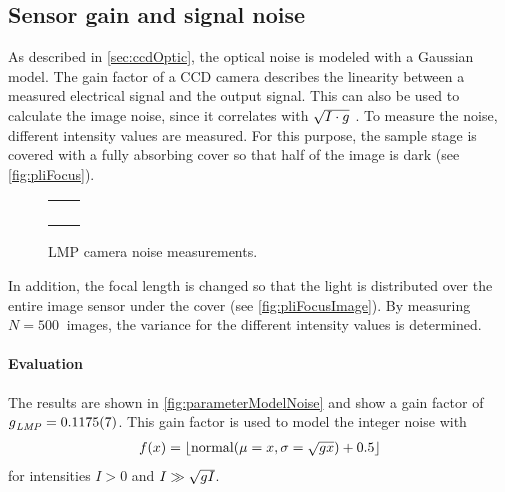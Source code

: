 \subsection{Sensor gain and signal noise}\label{sec:sensorGain}
%
As described in \cref{sec:ccdOptic}, the optical noise is modeled with a Gaussian model.
The gain factor of a \ac{CCD} camera describes the linearity between a measured electrical signal and the output signal.
This can also be used to calculate the image noise, since it correlates with $\sqrt{I \cdot \opticgain}$ \cite{Wiese:887678}.
To measure the noise, different intensity values are measured.
For this purpose, the sample stage is covered with a fully absorbing cover so that half of the image is dark (see \cref{fig:pliFocus}).
%
\begin{figure}[!t]
\centering
%
\setlength{\tikzwidth}{0.3\textwidth}
\setlength{\tikzheight}{0.3\textwidth}
%
\setlength{\tabcolsep}{0em}
\begin{tabular}{C{0.5\textwidth}C{0.5\textwidth}}
&
\\[-1em]
%
 &
 \\[2em]
%
&
\\[-1em]
%
 &
\end{tabular}
%
\caption[]{\ac{LMP} camera noise measurements.}
\label{fig:parameterModelGain}
\end{figure}
%
In addition, the focal length is changed so that the light is distributed over the entire image sensor under the cover (see \cref{fig:pliFocusImage}).
By measuring $N=\SI{500}{}$ images, the variance for the different intensity values is determined.
%
\paragraph{Evaluation}
The results are shown in \cref{fig:parameterModelNoise} and show a gain factor of $\opticgain_{\mathit{LMP}} = \SI{0.1175(7)}{}$.
This gain factor is used to model the integer noise with
\begin{align}
f(x) = \floor{\mathrm{normal}(\mu = x, \sigma=\sqrt{\opticgain x})+0.5}
\end{align}
for intensities $I > 0$ and $I \gg \sqrt{\opticgain I}$.
%
%
%
